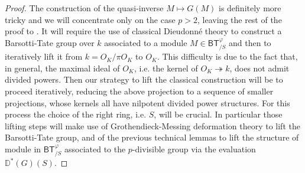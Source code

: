 \begin{proof}
The construction of the quasi-inverse $M \mapsto G(M)$
is definitely more tricky and we will concentrate only on
the case $p > 2$, leaving the rest of the proof to \cite{Kisin}.
It will require the use of classical Dieudonné theory to construct a
Barsotti-Tate group over $k$ associated to a module $M \in \mathsf{BT}^{\varphi}_{/S}$
and then to iteratively lift it from $k = O_K/\pi O_K$ to $O_K$.
This difficulty is due to the fact that, in general, the maximal
ideal of $O_K$, i.e. the kernel of $O_K \twoheadrightarrow k$, 
does not admit divided powers.
Then our strategy to lift the classical construction will be to
proceed iteratively, reducing the above projection to a sequence of
smaller projections, whose kernels all have nilpotent divided power structures.
For this process the choice of the right ring, i.e$.$ $S$, will be crucial.
In particular those lifting steps will make use of Grothendieck-Messing
deformation theory to lift the Barsotti-Tate group, and of the previous
technical lemmas to lift the structure of module in $\mathsf{BT}^{\varphi}_{/S}$
associated to the $p$-divisible group via the 
evaluation $\mathbb{D}^*(G)(S)$.



\end{proof}
